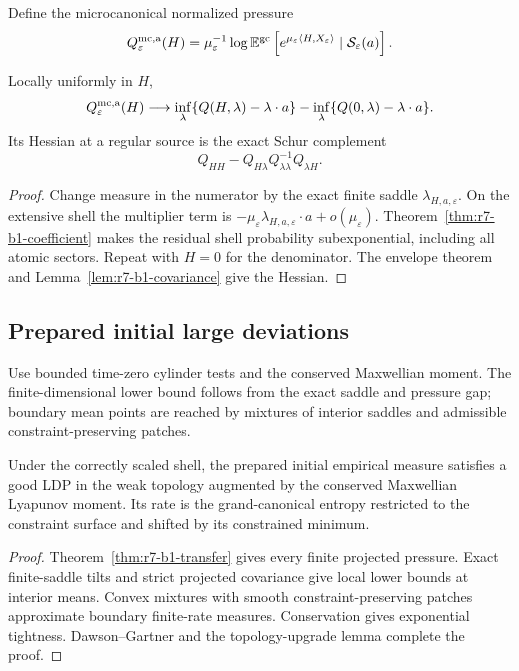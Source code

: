 Define the microcanonical normalized pressure
\[
 Q_\varepsilon^{\rm mc,a}(H)
 =\mu_\varepsilon^{-1}
  \log\mathbb E^{\rm gc}
  \left[e^{\mu_\varepsilon\langle H,X_\varepsilon\rangle}
  \mid\mathcal S_\varepsilon(a)\right].
\]

\begin{theorem}
\label{thm:r7-b1-transfer}
Locally uniformly in $H$,
\[
 Q_\varepsilon^{\rm mc,a}(H)\longrightarrow
 \inf_\lambda\{Q(H,\lambda)-\lambda\cdot a\}
 -\inf_\lambda\{Q(0,\lambda)-\lambda\cdot a\}.
\]
Its Hessian at a regular source is the exact Schur complement
\[
 Q_{HH}-Q_{H\lambda}Q_{\lambda\lambda}^{-1}Q_{\lambda H}.
\]
\end{theorem}

\begin{proof}
Change measure in the numerator by the exact finite saddle
$\lambda_{H,a,\varepsilon}$.  On the extensive shell the multiplier term is
$-\mu_\varepsilon\lambda_{H,a,\varepsilon}\cdot a+o(\mu_\varepsilon)$.
Theorem~\ref{thm:r7-b1-coefficient} makes the residual shell probability
subexponential, including all atomic sectors.  Repeat with $H=0$ for the
denominator.  The envelope theorem and
Lemma~\ref{lem:r7-b1-covariance} give the Hessian.
\end{proof}

\subsection{Prepared initial large deviations}

Use bounded time-zero cylinder tests and the conserved Maxwellian moment.  The
finite-dimensional lower bound follows from the exact saddle and pressure gap;
boundary mean points are reached by mixtures of interior saddles and admissible
constraint-preserving patches.

\begin{theorem}
\label{thm:r7-b1-ldp}
Under the correctly scaled shell, the prepared initial empirical measure
satisfies a good LDP in the weak topology augmented by the conserved
Maxwellian Lyapunov moment.  Its rate is the grand-canonical entropy restricted
to the constraint surface and shifted by its constrained minimum.
\end{theorem}

\begin{proof}
Theorem~\ref{thm:r7-b1-transfer} gives every finite projected pressure.
Exact finite-saddle tilts and strict projected covariance give local lower
bounds at interior means.  Convex mixtures with smooth constraint-preserving
patches approximate boundary finite-rate measures.  Conservation gives
exponential tightness.  Dawson--Gartner and the topology-upgrade lemma complete
the proof.
\end{proof}

